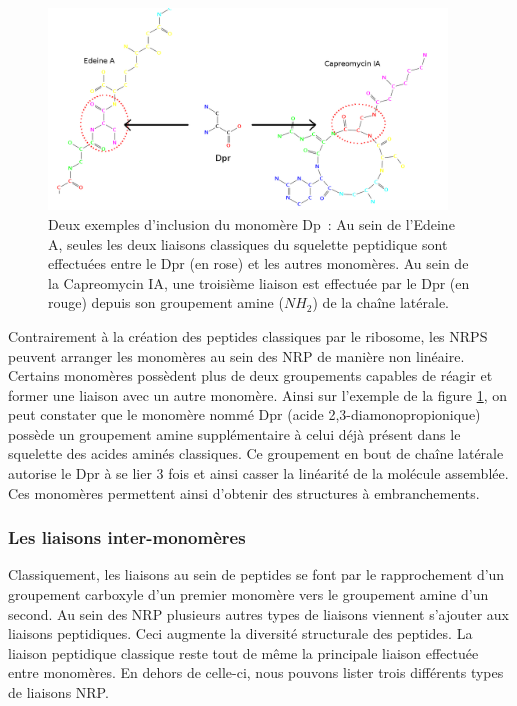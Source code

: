 \begin{figure}[h!]
  \begin{center}
    \includegraphics[width=400px]{Figures/bio/Intro/Dpr/2-3_liaisons.png}
    \caption{\label{DPR_incl}Deux exemples d'inclusion du monomère Dp~:
    Au sein de l'Edeine A, seules les deux liaisons classiques du squelette peptidique sont effectuées entre le Dpr (en rose) et les autres monomères.
    Au sein de la Capreomycin IA, une troisième liaison est effectuée par le Dpr (en rouge) depuis son groupement amine ($NH_2$) de la chaîne latérale.}
  \end{center}
\end{figure}

Contrairement à la création des peptides classiques par le ribosome, les NRPS peuvent arranger les monomères au sein des NRP de manière non linéaire.
Certains monomères possèdent plus de deux groupements capables de réagir et former une liaison avec un autre monomère.
Ainsi sur l'exemple de la figure \ref{DPR_incl}, on peut constater que le monomère nommé Dpr (acide 2,3-diamonopropionique) possède un groupement amine supplémentaire à celui déjà présent dans le squelette des acides aminés classiques.
Ce groupement en bout de chaîne latérale autorise le Dpr à se lier 3 fois et ainsi casser la linéarité de la molécule assemblée.
Ces monomères permettent ainsi d'obtenir des structures à embranchements.


\subsubsection{Les liaisons inter-monomères}

Classiquement, les liaisons au sein de peptides se font par le rapprochement d'un groupement carboxyle d'un premier monomère vers le groupement amine d'un second.
Au sein des NRP plusieurs autres types de liaisons viennent s'ajouter aux liaisons peptidiques.
Ceci augmente la diversité structurale des peptides.
La liaison peptidique classique reste tout de même la principale liaison effectuée entre monomères.
En dehors de celle-ci, nous pouvons lister trois différents types de liaisons NRP.

